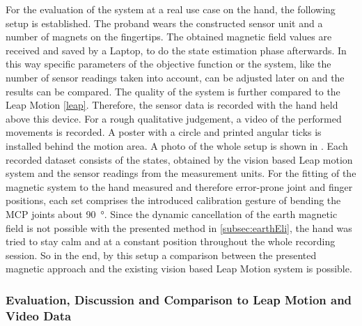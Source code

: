 For the evaluation of the system at a real use case on the hand, the following setup is established. The proband wears the constructed sensor unit and a number of magnets on the fingertips. The obtained magnetic field values are received and saved by a Laptop, to do the state estimation phase afterwards. In this way specific parameters of the objective function or the system, like the number of sensor readings taken into account, can be adjusted later on and the results can be compared. The quality of the system is further compared to the Leap Motion \ref{leap}. Therefore, the sensor data is recorded with the hand held above this device. For a rough qualitative judgement, a video of the performed movements is recorded. A poster with a circle and printed angular ticks is installed behind the motion area. A photo of the whole setup is shown in . Each recorded dataset consists of the states, obtained by the vision based Leap motion system and the sensor readings from the measurement units. For the fitting of the magnetic system to the hand measured and therefore error-prone joint and finger positions, each set comprises the introduced calibration gesture of bending the \ac{MCP} joints about \SI{90}{\degree}. Since the dynamic cancellation of the earth magnetic field is not possible with the presented method in \ref{subsec:earthEli}, the hand was tried to stay calm and at a constant position throughout the whole recording session. So in the end, by this setup a comparison between the presented magnetic approach and the existing vision based Leap Motion system is possible.

\subsubsection{Evaluation, Discussion and Comparison to Leap Motion and Video Data}

